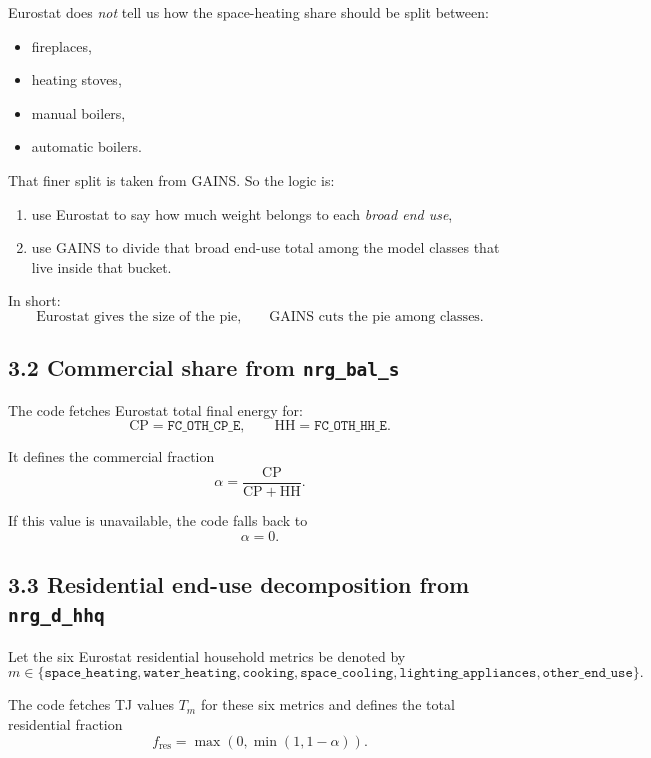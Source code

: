 \documentclass[11pt,a4paper]{article}
\begin{document}
Eurostat does \emph{not} tell us how the space-heating share should be split between:

\begin{itemize}[leftmargin=1.4em]
  \item fireplaces,
  \item heating stoves,
  \item manual boilers,
  \item automatic boilers.
\end{itemize}

That finer split is taken from GAINS. So the logic is:

\begin{enumerate}[leftmargin=1.4em]
  \item use Eurostat to say how much weight belongs to each \emph{broad end use},
  \item use GAINS to divide that broad end-use total among the model classes that
  live inside that bucket.
\end{enumerate}

In short:
\[
\text{Eurostat gives the size of the pie,}
\qquad
\text{GAINS cuts the pie among classes.}
\]

\subsection{3.2 Commercial share from \texttt{nrg\_bal\_s}}

The code fetches Eurostat total final energy for:
\[
\mathrm{CP} = \texttt{FC\_OTH\_CP\_E},
\qquad
\mathrm{HH} = \texttt{FC\_OTH\_HH\_E}.
\]

It defines the commercial fraction
\[
\alpha = \frac{\mathrm{CP}}{\mathrm{CP} + \mathrm{HH}}.
\]

If this value is unavailable, the code falls back to
\[
\alpha = 0.
\]

\subsection{3.3 Residential end-use decomposition from \texttt{nrg\_d\_hhq}}

Let the six Eurostat residential household metrics be denoted by
\[
m \in \{
\texttt{space\_heating},
\texttt{water\_heating},
\texttt{cooking},
\texttt{space\_cooling},
\texttt{lighting\_appliances},
\texttt{other\_end\_use}
\}.
\]

The code fetches TJ values $T_m$ for these six metrics and defines the total
residential fraction
\[
f_{\mathrm{res}} = \max(0, \min(1, 1-\alpha)).
\]
\end{document}
